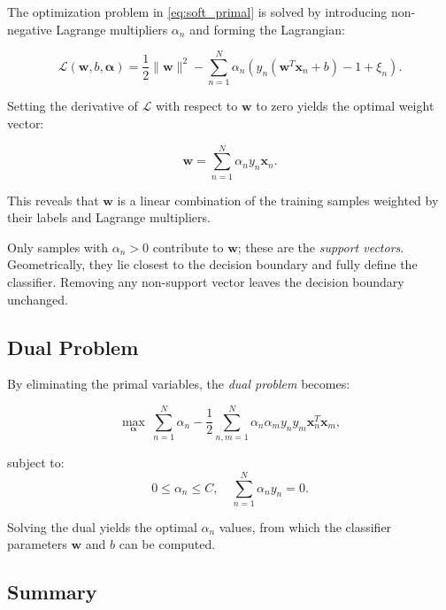 \documentclass[conference]{IEEEtran}
\begin{document}
	The optimization problem in \eqref{eq:soft_primal} is solved by introducing non-negative Lagrange multipliers $\alpha_n$ and forming the Lagrangian:
	
	\begin{equation}
		\mathcal{L}(\mathbf{w}, b, \boldsymbol{\alpha}) = 
		\frac{1}{2}\|\mathbf{w}\|^2 -
		\sum_{n=1}^N \alpha_n \left( y_n(\mathbf{w}^T \mathbf{x}_n + b) - 1 + \xi_n \right).
	\end{equation}
	
	Setting the derivative of $\mathcal{L}$ with respect to $\mathbf{w}$ to zero yields the optimal weight vector:
	
	\begin{equation}
		\mathbf{w} = \sum_{n=1}^{N} \alpha_n y_n \mathbf{x}_n.
	\end{equation}
	
	This reveals that $\mathbf{w}$ is a linear combination of the training samples weighted by their labels and Lagrange multipliers.
	
	Only samples with $\alpha_n > 0$ contribute to $\mathbf{w}$; these are the \textit{support vectors}. Geometrically, they lie closest to the decision boundary and fully define the classifier. Removing any non-support vector leaves the decision boundary unchanged.
	
	\subsection{Dual Problem}
	
	By eliminating the primal variables, the \textit{dual problem} becomes:
	
	\begin{equation}
		\max_{\boldsymbol{\alpha}} \ \sum_{n=1}^N \alpha_n - \frac{1}{2} \sum_{n,m=1}^N \alpha_n \alpha_m y_n y_m \mathbf{x}_n^T \mathbf{x}_m,
	\end{equation}
	
	subject to:
	\begin{equation}
		0 \le \alpha_n \le C, \quad
		\sum_{n=1}^N \alpha_n y_n = 0.
	\end{equation}
	
	Solving the dual yields the optimal $\alpha_n$ values, from which the classifier parameters $\mathbf{w}$ and $b$ can be computed.
	
	\subsection{Summary}
	
\end{document}
